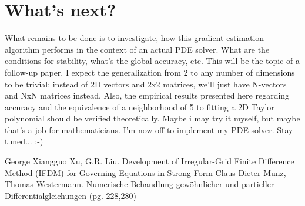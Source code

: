 \section{What's next?}
What remains to be done is to investigate, how this gradient estimation algorithm performs in the context of an actual PDE solver. What are the conditions for stability, what's the global accuracy, etc. This will be the topic of a follow-up paper. I expect the generalization from 2 to any number of dimensions to be trivial: instead of 2D vectors and 2x2 matrices, we'll just have N-vectors and NxN matrices instead. Also, the empirical results presented here regarding accuracy and the equivalence of a neighborhood of 5 to fitting a 2D Taylor polynomial should be verified theoretically. Maybe i may try it myself, but maybe that's a job for mathematicians. I'm now off to implement my PDE solver. Stay tuned... :-)




\begin{thebibliography}{9}  %
  George Xiangguo Xu, G.R. Liu. Development of Irregular-Grid Finite Difference Method (IFDM) for Governing Equations in Strong Form
  Claus-Dieter Munz, Thomas Westermann. Numerische Behandlung gewöhnlicher und partieller Differentialgleichungen (pg. 228,280)
\end{thebibliography}

